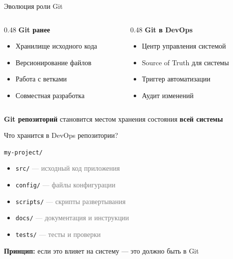 \documentclass[aspectratio=169]{beamer}
\begin{document}
    \begin{frame}{Эволюция роли Git}
        \begin{columns}
            \begin{column}{0.48\textwidth}
                \textbf{Git ранее}
                \begin{itemize}
                    \item Хранилище исходного кода
                    \item Версионирование файлов
                    \item Работа с ветками
                    \item Совместная разработка
                \end{itemize}
            \end{column}

            \begin{column}{0.48\textwidth}
                \textbf{Git в DevOps}
                \begin{itemize}
                    \item Центр управления системой
                    \item Source of Truth для системы
                    \item Триггер автоматизации
                    \item Аудит изменений
                \end{itemize}
            \end{column}
        \end{columns}

        \vspace{0.5cm}

        \textbf{Git репозиторий} становится местом хранения состояния \textbf{всей системы}
    \end{frame}

    \begin{frame}{Что хранится в DevOps репозитории?}
        \begin{center}
            \large
            \texttt{my-project/}
        \end{center}

        \begin{itemize}
            \item \texttt{src/} \textcolor{gray}{— исходный код приложения}
            \item \texttt{config/} \textcolor{gray}{— файлы конфигурации}
            \item \texttt{scripts/} \textcolor{gray}{— скрипты развертывания}
            \item \texttt{docs/} \textcolor{gray}{— документация и инструкции}
            \item \texttt{tests/} \textcolor{gray}{— тесты и проверки}
        \end{itemize}

        \vspace{0.2cm}

        \textbf{Принцип:} если это влияет на систему — это должно быть в Git
    \end{frame}
\end{document}
